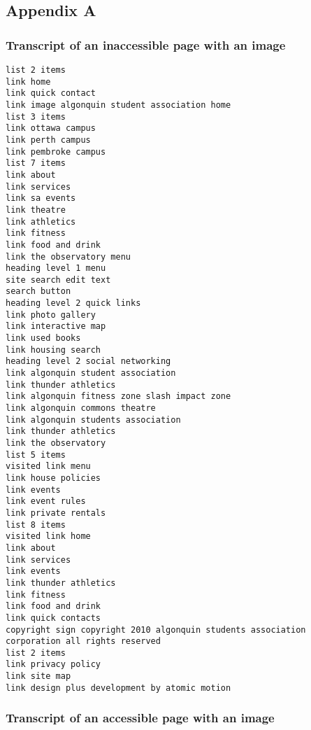 \clearpage

\subsection{Appendix A}\label{appendix-a}

\subsubsection{Transcript of an inaccessible page with an
image}\label{transcript-of-an-inaccessible-page-with-an-image}

\begin{verbatim}
list 2 items
link home
link quick contact
link image algonquin student association home
list 3 items
link ottawa campus
link perth campus
link pembroke campus
list 7 items
link about
link services
link sa events
link theatre
link athletics
link fitness
link food and drink
link the observatory menu
heading level 1 menu
site search edit text
search button
heading level 2 quick links
link photo gallery
link interactive map
link used books
link housing search
heading level 2 social networking
link algonquin student association
link thunder athletics
link algonquin fitness zone slash impact zone
link algonquin commons theatre
link algonquin students association
link thunder athletics
link the observatory
list 5 items
visited link menu
link house policies
link events
link event rules
link private rentals
list 8 items
visited link home
link about
link services
link events
link thunder athletics
link fitness
link food and drink
link quick contacts
copyright sign copyright 2010 algonquin students association corporation all rights reserved
list 2 items
link privacy policy
link site map
link design plus development by atomic motion
\end{verbatim}

\subsubsection{Transcript of an accessible page with an
image}\label{transcript-of-an-accessible-page-with-an-image}

